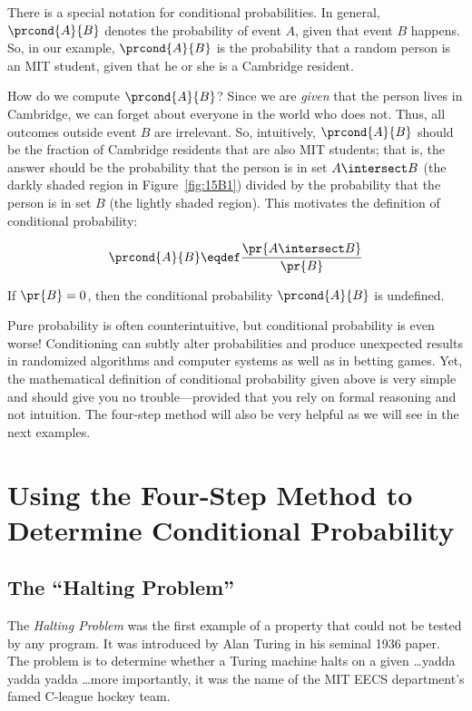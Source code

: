 There is a special notation for conditional probabilities.  In
general, $\prcond{A}{B}$ denotes the probability of event $A$, given
that event $B$ happens.  So, in our example, $\prcond{A}{B}$ is the
probability that a random person is an MIT student, given that he or
she is a Cambridge resident.

How do we compute $\prcond{A}{B}$?  Since we are \emph{given} that the
person lives in Cambridge, we can forget about everyone in the world
who does not.  Thus, all outcomes outside event $B$ are irrelevant.
So, intuitively, $\prcond{A}{B}$ should be the fraction of Cambridge
residents that are also MIT students; that is, the answer should be
the probability that the person is in set $A \intersect B$ (the darkly
shaded region in Figure~\ref{fig:15B1}) divided by the probability
that the person is in set $B$ (the lightly shaded region).  This
motivates the definition of conditional probability:
\begin{definition}\label{LN12:prcond}
\[
\prcond{A}{B} \eqdef \frac{\pr{A \intersect B}}{\pr{B}}
\]
\end{definition}
If $\pr{B} = 0$, then the conditional probability $\prcond{A}{B}$ is
undefined.

Pure probability is often counterintuitive, but conditional
probability is even worse!  Conditioning can subtly alter
probabilities and produce unexpected results in randomized algorithms
and computer systems as well as in betting games.  Yet, the
mathematical definition of conditional probability given above is very
simple and should give you no trouble---provided that you rely on
formal reasoning and not intuition.  The four-step method will also be
very helpful as we will see in the next examples.

\section{Using the Four-Step Method to Determine Conditional
  Probability}

\subsection{The ``Halting Problem''}

The \emph{Halting Problem} was the first example of a property that
could not be tested by any program.  It was introduced by Alan Turing
in his seminal 1936 paper.  The problem is to determine whether a
Turing machine halts on a given \dots yadda yadda yadda \dots more
importantly, it was the name of the MIT EECS department's famed
C-league hockey team.

